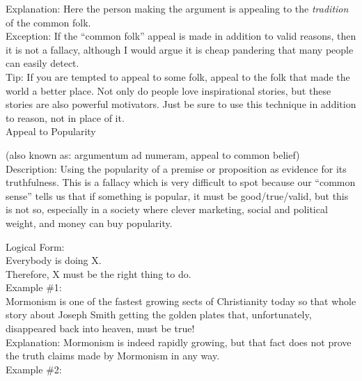 \documentclass[a4paper,12pt,single,pdftex]{scrartcl}
\begin{document}
    
      Explanation: Here the person making the argument is appealing to the {\it tradition} of the common folk.
    \\

    
      Exception: If the “common folk” appeal is made in addition to valid reasons, then it is not a fallacy, although I would argue it is cheap pandering that many people can easily detect.
    \\

    
      Tip: If you are tempted to appeal to some folk, appeal to the folk that made the world a better place. Not only do people love inspirational stories, but these stories are also powerful motivators. Just be sure to use this technique in addition to reason, not in place of it.
    \\

  

Appeal to Popularity
    
      (also known as: argumentum ad numeram, appeal to common belief)
    \\

  
    Description: Using the popularity of a premise or proposition as evidence for its truthfulness.  This is a fallacy which is very difficult to spot because our “common sense” tells us that if something is popular, it must be good/true/valid, but this is not so, especially in a society where clever marketing, social and political weight, and money can buy popularity.

    
      Logical Form:
    \\

    
      Everybody is doing X.
    \\

    
      Therefore, X must be the right thing to do.
    \\

    
      Example \#1: 
    \\

    
      Mormonism is one of the fastest growing sects of Christianity today so that whole story about Joseph Smith getting the golden plates that, unfortunately, disappeared back into heaven, must be true!
    \\

    
      Explanation: Mormonism is indeed rapidly growing, but that fact does not prove the truth claims made by Mormonism in any way.
    \\

    
      Example \#2: 
    \\
\end{document}
